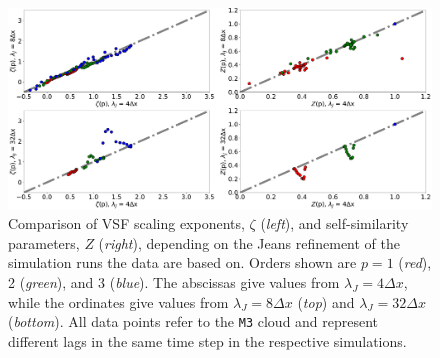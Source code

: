 \begin{figure}
	\centering
    \includegraphics[width=\textwidth]{comp_jeans.pdf}
    \caption{Comparison of VSF scaling exponents, $\zeta$ (\textit{left}), and self-similarity parameters, $Z$ (\textit{right}), depending on the Jeans refinement of the simulation runs the data are based on.  
     Orders shown are $p=1$ ({\em red}), 2 ({\em green}), and 3 ({\em blue}). 
The abscissas give values from $\lambda_J = 4\Delta{}x$, while the ordinates give values from $\lambda_J = 8\Delta{}x$ (\textit{top}) and $\lambda_J = 32\Delta{}x$ (\textit{bottom}). All data points refer to the \texttt{M3} cloud and represent
   different lags in 
the same time step in the respective simulations. 
    }
    \label{pic:results:jeans_comp}
\end{figure}


